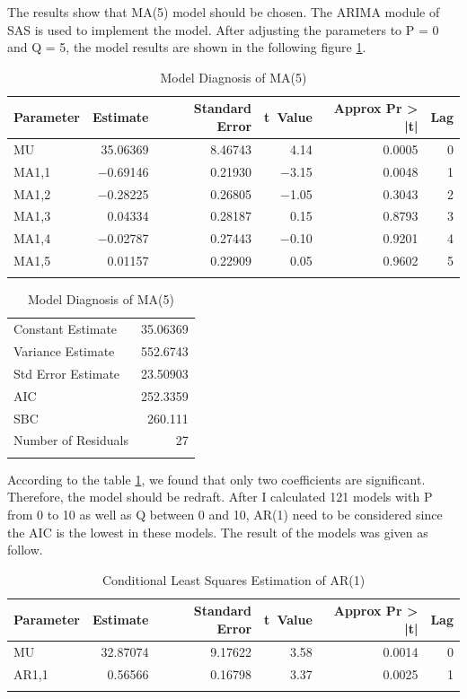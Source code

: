 The results show that MA(5) model should be chosen. The ARIMA module of SAS is used to implement the model. After adjusting the parameters to P = 0 and Q = 5, the model results are shown in the following figure \ref{t2}.

\begin{table}[H]
\centering
\begin{longtable}{lrrrrr}
\toprule
   Parameter &    Estimate &    Standard {\newline} Error &    t~Value &    Approx {\newline} Pr > |t| &    Lag\\
\endhead
\midrule
   MU &    35.06369 &    8.46743 &    4.14 &    0.0005 &    0\\
   MA1,1 &    $-$0.69146 &    0.21930 &    $-$3.15 &    0.0048 &    1\\
   MA1,2 &    $-$0.28225 &    0.26805 &    $-$1.05 &    0.3043 &    2\\
   MA1,3 &    0.04334 &    0.28187 &    0.15 &    0.8793 &    3\\
   MA1,4 &    $-$0.02787 &    0.27443 &    $-$0.10 &    0.9201 &    4\\
   MA1,5 &    0.01157 &    0.22909 &    0.05 &    0.9602 &    5\\
\bottomrule
\caption{Conditional Least Squares Estimation of MA(5)}
\label{t2}
\end{longtable}

\begin{longtable}{lr}
\toprule
   Constant Estimate &    35.06369\\
   Variance Estimate &    552.6743\\
   Std Error Estimate &    23.50903\\
   AIC &    252.3359\\
   SBC &    260.111\\
   Number of Residuals &    27\\
\bottomrule
\caption{Model Diagnosis of MA(5)}
\label{t3}
\end{longtable}
\end{table}

According to the table \ref{t2}, we found that only two coefficients are significant. Therefore, the model should be redraft. After I calculated 121 models with P from 0 to 10 as well as Q between 0 and 10, AR(1) need to be considered since the AIC is the lowest in these models. The result of the models was given as follow.

\begin{table}[H]
\centering
\begin{longtable}{lrrrrr}
\toprule
   Parameter &    Estimate &    Standard {\newline} Error &    t~Value &    Approx {\newline} Pr > |t| &    Lag\\
\endhead
\midrule
   MU &    32.87074 &    9.17622 &    3.58 &    0.0014 &    0\\
   AR1,1 &    0.56566 &    0.16798 &    3.37 &    0.0025 &    1\\
\bottomrule
\caption{Conditional Least Squares Estimation of AR(1)}
\label{t4}
\end{longtable}
\end{table}

